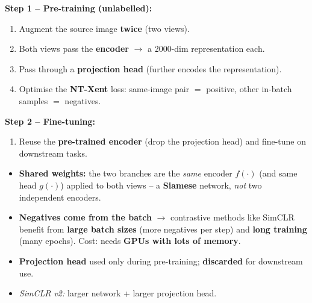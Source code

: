 \documentclass[10pt,a4paper]{article}
\begin{document}
	\begin{importantbox}
		\textbf{Step 1 -- Pre-training (unlabelled):}
		\begin{enumerate}[leftmargin=*,nosep]
			\item Augment the source image \textbf{twice} (two views).
			\item Both views pass the \textbf{encoder} $\to$ a 2000-dim representation each.
			\item Pass through a \textbf{projection head} (further encodes the representation).
			\item Optimise the \textbf{NT-Xent} loss: same-image pair $=$ positive, other in-batch samples $=$ negatives.
		\end{enumerate}
		\textbf{Step 2 -- Fine-tuning:}
		\begin{enumerate}[leftmargin=*,nosep,start=5]
			\item Reuse the \textbf{pre-trained encoder} (drop the projection head) and fine-tune on downstream tasks.
		\end{enumerate}
	\end{importantbox}

	\begin{itemize}[leftmargin=*]
		\item \textbf{Shared weights:} the two branches are the \emph{same} encoder $f(\cdot)$ (and same head $g(\cdot)$) applied to both views -- a \textbf{Siamese} network, \emph{not} two independent encoders.
		\item \textbf{Negatives come from the batch} $\to$ contrastive methods like SimCLR benefit from \textbf{large batch sizes} (more negatives per step) and \textbf{long training} (many epochs). Cost: needs \textbf{GPUs with lots of memory}.
		\item \textbf{Projection head} used only during pre-training; \textbf{discarded} for downstream use.
		\item \emph{SimCLR v2:} larger network + larger projection head.
	\end{itemize}
\end{document}
